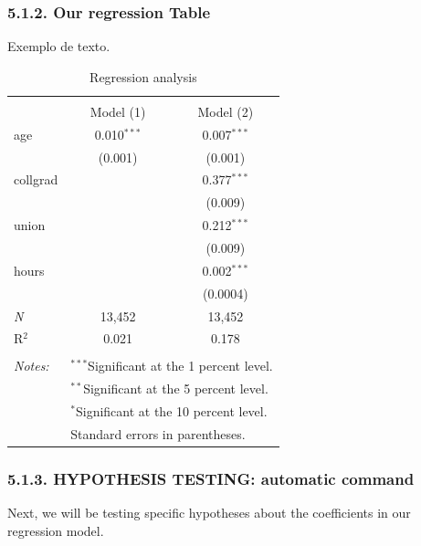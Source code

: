 \documentclass[
]{article}
\begin{document}
\subsubsection{5.1.2. Our regression Table}\label{our-regression-table}

Exemplo de texto.

\begin{table}[!ht] \centering 
  \caption{Regression analysis} 
  \label{regressions} 
\begin{tabular}{@{\extracolsep{5pt}}lcc} 
\\[-1.8ex]\hline 
\hline \\[-1.8ex] 
 & Model (1) & Model (2) \\ 
 age & 0.010$^{***}$ & 0.007$^{***}$ \\ 
  & (0.001) & (0.001) \\ 
  collgrad &  & 0.377$^{***}$ \\ 
  &  & (0.009) \\ 
  union &  & 0.212$^{***}$ \\ 
  &  & (0.009) \\ 
  hours &  & 0.002$^{***}$ \\ 
  &  & (0.0004) \\ 
 \textit{N} & 13,452 & 13,452 \\ 
R$^{2}$ & 0.021 & 0.178 \\ 
\hline 
\hline \\[-1.8ex] 
\textit{Notes:} & \multicolumn{2}{l}{$^{***}$Significant at the 1 percent level.} \\ 
 & \multicolumn{2}{l}{$^{**}$Significant at the 5 percent level.} \\ 
 & \multicolumn{2}{l}{$^{*}$Significant at the 10 percent level.} \\ 
 & \multicolumn{2}{l}{Standard errors in parentheses.} \\ 
\end{tabular} 
\end{table}

\subsubsection{5.1.3. HYPOTHESIS TESTING: automatic
command}\label{hypothesis-testing-automatic-command}

Next, we will be testing specific hypotheses about the coefficients in
our regression model.
\end{document}
